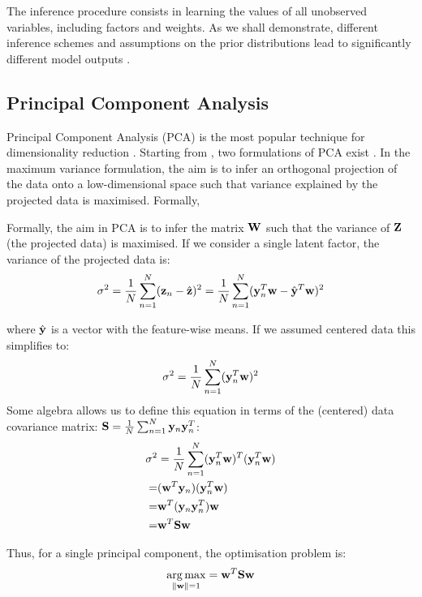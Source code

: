 The inference procedure consists in learning the values of all unobserved variables, including factors and weights. As we shall demonstrate, different inference schemes and assumptions on the prior distributions lead to significantly different model outputs \cite{Rattray2009}.


\subsection{Principal Component Analysis} \label{section:pca}

Principal Component Analysis (PCA) is the most popular technique for dimensionality reduction \cite{Hotelling1933,Ringner2008}. Starting from , two formulations of PCA exist \cite{Bishop2006}. In the maximum variance formulation, the aim is to infer an orthogonal projection of the data onto a low-dimensional space such that variance explained by the projected data is maximised. Formally, 

Formally, the aim in PCA is to infer the matrix ${\bf W}$ such that the variance of ${\bf Z}$ (the projected data) is maximised. If we consider a single latent factor, the variance of the projected data is:
\begin{equation*}
	\sigma^2 = \frac{1}{N}\sum_{n=1}^{N} ({\bf z}_n - \hat{{\bf z}})^{2} = \frac{1}{N}\sum_{n=1}^{N} ({\bf y}_n^T {\bf w} - \hat{{\bf y}}^T{\bf w})^{2}
\end{equation*}

where $\hat{{\bf y}}$ is a vector with the feature-wise means. If we assumed centered data this simplifies to:
\begin{equation*}
	\sigma^2 = \frac{1}{N}\sum_{n=1}^{N} ({\bf y}_n^T {\bf w})^{2}
\end{equation*}
Some algebra allows us to define this equation in terms of the (centered) data covariance matrix: ${\bf S} = \frac{1}{N}\sum_{n=1}^{N} {\bf y}_n{\bf y}_n^T$:
\begin{align*}
	\sigma^2 &= \frac{1}{N}\sum_{n=1}^{N} ({\bf y}_n^T {\bf w})^T ({\bf y}_n^T {\bf w}) \\
	=& ({\bf w}^T {\bf y}_n) ({\bf y}_n^T {\bf w}) \\
	=& {\bf w}^T ({\bf y}_n {\bf y}_n^T) {\bf w} \\
	=& {\bf w}^T {\bf S} {\bf w}
\end{align*}

Thus, for a single principal component, the optimisation problem is:
\begin{equation} \label{eq:pca}
	\operatorname*{arg\,max}_{\|{\bf w}\|=1} = {\bf w}^T {\bf S} {\bf w}
\end{equation}

